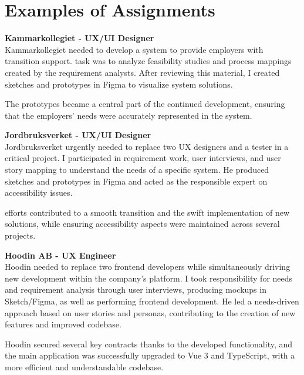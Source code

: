 \documentclass[a4paper,10pt]{article}
\begin{document}
\vspace{0.5cm}

\section*{Examples of Assignments}

\textbf{Kammarkollegiet - UX/UI Designer}\\
Kammarkollegiet needed to develop a system to provide employers with transition support. task was to analyze feasibility studies and process mappings created by the requirement analysts. After reviewing this material, I created sketches and prototypes in Figma to visualize system solutions.

The prototypes became a central part of the continued development, ensuring that the employers' needs were accurately represented in the system.

\vspace{0.3cm}

\textbf{Jordbruksverket - UX/UI Designer}\\
Jordbruksverket urgently needed to replace two UX designers and a tester in a critical project. I participated in requirement work, user interviews, and user story mapping to understand the needs of a specific system. He produced sketches and prototypes in Figma and acted as the responsible expert on accessibility issues.

efforts contributed to a smooth transition and the swift implementation of new solutions, while ensuring accessibility aspects were maintained across several projects.

\vspace{0.3cm}

\textbf{Hoodin AB - UX Engineer}\\
Hoodin needed to replace two frontend developers while simultaneously driving new development within the company's platform. I took responsibility for needs and requirement analysis through user interviews, producing mockups in Sketch/Figma, as well as performing frontend development. He led a needs-driven approach based on user stories and personas, contributing to the creation of new features and improved codebase.

\vspace{0.3cm}

Hoodin secured several key contracts thanks to the developed functionality, and the main application was successfully upgraded to Vue 3 and TypeScript, with a more efficient and understandable codebase.
\end{document}

